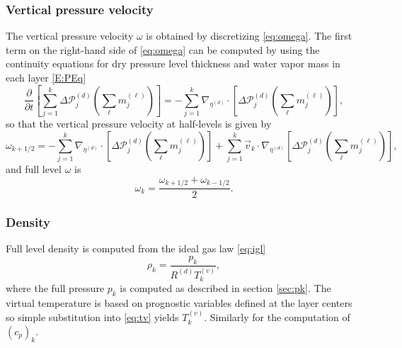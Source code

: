\documentclass{agujournal}
\begin{document}
\subsubsection{Vertical pressure velocity}
The vertical pressure velocity $\omega$ is obtained by discretizing \eqref{eq:omega}. The first term on the right-hand side of \eqref{eq:omega} can be computed by using the continuity equations for dry pressure level thickness and water vapor mass in each layer \eqref{E:PEq}
\begin{equation}
\frac{\partial }{\partial t}\left[\sum_{j=1}^k \Delta \mathcal{P}^{(d)}_j \left( \sum_\ell m_j^{(\ell)}\right)\right] = -\sum_{j=1}^k \nabla_{\eta^{(d)}}\cdot \left[ \Delta \mathcal{P}^{(d)}_j\left(\sum_\ell m_j^{(\ell)} \right)\right],
\end{equation}
so that the vertical pressure velocity at half-levels is given by
\begin{equation}
\omega_{k+1/2}=-\sum_{j=1}^k \nabla_{\eta^{(d)}}\cdot \left[ \Delta \mathcal{P}^{(d)}_j\left(\sum_\ell m_j^{(\ell)} \right)\right]+\sum_{j=1}^k \vec{v}_k \cdot \nabla_{\eta^{(d)}}\left[ \Delta \mathcal{P}^{(d)}_j\left( \sum_\ell m_j^{(\ell)}\right)\right],
\end{equation}
and full level $\omega$ is
\begin{equation}
\omega_k=\frac{\omega_{k+1/2}+\omega_{k-1/2}}{2}.
\end{equation}
\subsubsection{Density}
Full level density is computed from the ideal gas law \eqref{eq:igl}
\begin{equation}
\rho_k=\frac{p_k}{R^{(d)} T_k^{(v)}},
\end{equation}
where the full pressure $p_k$ is computed as described in section \ref{sec:pk}. The virtual temperature is based on prognostic variables defined at the layer centers so simple substitution into \eqref{eq:tv} yields $T_k^{(v)}$. Similarly for the computation of $\left( c_p\right)_k$.
\end{document}
